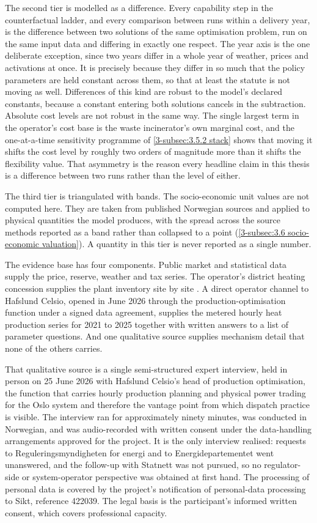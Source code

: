 The second tier is modelled as a difference. Every capability step in the counterfactual ladder, and every comparison between runs within a delivery year, is the difference between two solutions of the same optimisation problem, run on the same input data and differing in exactly one respect. The year axis is the one deliberate exception, since two years differ in a whole year of weather, prices and activations at once. It is precisely because they differ in so much that the policy parameters are held constant across them, so that at least the statute is not moving as well. Differences of this kind are robust to the model's declared constants, because a constant entering both solutions cancels in the subtraction. Absolute cost levels are not robust in the same way. The single largest term in the operator's cost base is the waste incinerator's own marginal cost, and the one-at-a-time sensitivity programme of \autoref{3-subsec:3.5.2 stack} shows that moving it shifts the cost level by roughly two orders of magnitude more than it shifts the flexibility value. That asymmetry is the reason every headline claim in this thesis is a difference between two runs rather than the level of either.

The third tier is triangulated with bands. The socio-economic unit values are not computed here. They are taken from published Norwegian sources and applied to physical quantities the model produces, with the spread across the source methods reported as a band rather than collapsed to a point (\autoref{3-subsec:3.6 socio-economic valuation}). A quantity in this tier is never reported as a single number.

The evidence base has four components. Public market and statistical data supply the price, reserve, weather and tax series. The operator's district heating concession supplies the plant inventory site by site \cite{nve_konsesjonssak_2026}. A direct operator channel to Hafslund Celsio, opened in June 2026 through the production-optimisation function under a signed data agreement, supplies the metered hourly heat production series for 2021 to 2025 together with written answers to a list of parameter questions. And one qualitative source supplies mechanism detail that none of the others carries.

That qualitative source is a single semi-structured expert interview, held in person on 25 June 2026 with Hafslund Celsio's head of production optimisation, the function that carries hourly production planning and physical power trading for the Oslo system and therefore the vantage point from which dispatch practice is visible. The interview ran for approximately ninety minutes, was conducted in Norwegian, and was audio-recorded with written consent under the data-handling arrangements approved for the project. It is the only interview realised: requests to Reguleringsmyndigheten for energi and to Energidepartementet went unanswered, and the follow-up with Statnett was not pursued, so no regulator-side or system-operator perspective was obtained at first hand. The processing of personal data is covered by the project's notification of personal-data processing to Sikt, reference 422039. The legal basis is the participant's informed written consent, which covers professional capacity.

